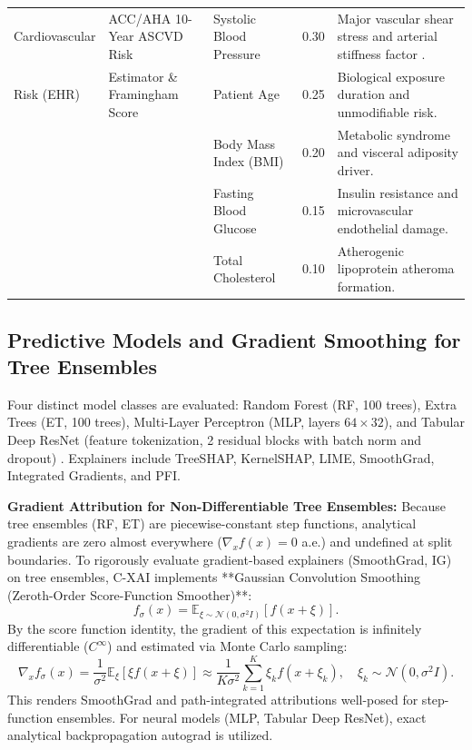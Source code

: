 \documentclass[3p,times,procedia]{elsarticle}
\theoremstyle{definition}
\begin{document}
\begin{table}[t]
\begin{tabular}{lp{3.8cm}p{3.5cm}cp{5.2cm}}
\midrule
Cardiovascular & ACC/AHA 10-Year ASCVD Risk & Systolic Blood Pressure & 0.30 & Major vascular shear stress and arterial stiffness factor \cite{goff2014aha}. \\
Risk (EHR) & Estimator \& Framingham Score \cite{goff2014aha} & Patient Age & 0.25 & Biological exposure duration and unmodifiable risk. \\
& & Body Mass Index (BMI) & 0.20 & Metabolic syndrome and visceral adiposity driver. \\
& & Fasting Blood Glucose & 0.15 & Insulin resistance and microvascular endothelial damage. \\
& & Total Cholesterol & 0.10 & Atherogenic lipoprotein atheroma formation. \\
\bottomrule
\end{tabular}
\end{table}

\subsection{Predictive Models and Gradient Smoothing for Tree Ensembles}

Four distinct model classes are evaluated: Random Forest (RF, 100 trees), Extra Trees (ET, 100 trees), Multi-Layer Perceptron (MLP, layers $64\times 32$), and Tabular Deep ResNet (feature tokenization, 2 residual blocks with batch norm and dropout) \cite{gorishniy2021revisiting}. Explainers include TreeSHAP, KernelSHAP, LIME, SmoothGrad, Integrated Gradients, and PFI.

\textbf{Gradient Attribution for Non-Differentiable Tree Ensembles:}  
Because tree ensembles (RF, ET) are piecewise-constant step functions, analytical gradients are zero almost everywhere ($\nabla_x f(x) = 0$ a.e.) and undefined at split boundaries. To rigorously evaluate gradient-based explainers (SmoothGrad, IG) on tree ensembles, C-XAI implements **Gaussian Convolution Smoothing (Zeroth-Order Score-Function Smoother)**:
\begin{equation}
f_\sigma(x) = \mathbb{E}_{\xi \sim \mathcal{N}(0, \sigma^2 I)} [f(x + \xi)].
\label{eq:score_func}
\end{equation}
By the score function identity, the gradient of this expectation is infinitely differentiable ($C^\infty$) and estimated via Monte Carlo sampling:
\begin{equation}
\nabla_x f_\sigma(x) = \frac{1}{\sigma^2}\mathbb{E}_\xi [\xi f(x+\xi)] \approx \frac{1}{K \sigma^2}\sum_{k=1}^{K}\xi_k f(x+\xi_k), \quad \xi_k \sim \mathcal{N}(0, \sigma^2 I).
\end{equation}
This renders SmoothGrad and path-integrated attributions well-posed for step-function ensembles. For neural models (MLP, Tabular Deep ResNet), exact analytical backpropagation autograd is utilized.
\end{document}
